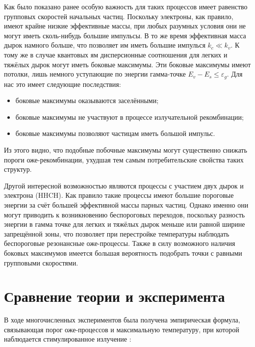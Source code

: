 \documentclass[../main.tex]{subfiles}
\begin{document}
        Как было показано ранее особую важность для таких процессов имеет
        равенство групповых скоростей начальных частиц. Поскольку электроны, как правило,
        имеют крайне низкие эффективные массы, при любых разумных условия они не могут иметь
        сколь-нибудь большие импульсы. В то же время эффективная масса дырок намного больше,
        что позволяет им иметь большие импулься $k_c \ll k_v$. К тому же в случае квантовых ям
        дисперсионные соотношения для легких и тяжёлых дырок могут иметь боковые максимумы.
        Эти боковые максимумы имеют потолки, лишь немного уступающие по энергии гамма-точке 
        $E_v - E_s \le \varepsilon_g$. Для нас это имеет следующие последствия:
        \begin{itemize}
            \item боковые максимумы оказываются заселёнными;
            \item боковые максимумы не участвуют в процессе излучательной рекомбинации;
            \item боковые максимумы позволяют частицам иметь большой импульс.
        \end{itemize}
        
        Из этого видно, что подобные побочные максимумы могут существенно снижать пороги 
        оже-рекомбинации, ухудшая тем самым потребительские свойства таких структур.

        Другой интересной возможностью являются процессы с участием двух дырок и 
        электрона (HHCH). Как правило такие процессы имеют большие пороговые энергии
        за счёт большей эффективной массы парных частиц.
        Однако именно они могут приводить к возникновению беспороговых переходов,
        поскольку разность энергии в гамма точке для легких и тяжёлых дырок
        меньше или равной ширине запрещённой зоны, что позволяет при перестройке
        температуры наблюдать беспороговые резонансные оже-процессы. Также в силу 
        возможного наличия боковых максимумов имеется большая вероятность подобрать
        точки с равными групповыми скоростями.

        \section{Сравнение теории и эксперимента}

        В ходе многочисленных экспериментов была получена эмпирическая 
        формула, связывающая порог оже-процессов и максимальную температуру, при которой
        наблюдается стимулированное излучение \cite{Rumyantsev:PTS:2018}:
\end{document}
